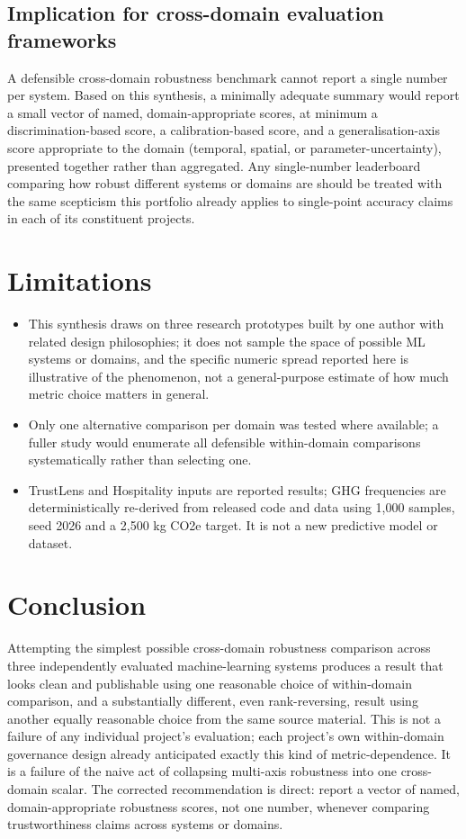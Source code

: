 \documentclass[11pt]{article}
\begin{document}
\subsection{Implication for cross-domain evaluation frameworks}

A defensible cross-domain robustness benchmark cannot report a single number per system. Based on this synthesis, a minimally adequate summary would report a small vector of named, domain-appropriate scores, at minimum a discrimination-based score, a calibration-based score, and a generalisation-axis score appropriate to the domain (temporal, spatial, or parameter-uncertainty), presented together rather than aggregated. Any single-number leaderboard comparing how robust different systems or domains are should be treated with the same scepticism this portfolio already applies to single-point accuracy claims in each of its constituent projects.

\section{Limitations}

\begin{itemize}[leftmargin=*]
    \item This synthesis draws on three research prototypes built by one author with related design philosophies; it does not sample the space of possible ML systems or domains, and the specific numeric spread reported here is illustrative of the phenomenon, not a general-purpose estimate of how much metric choice matters in general.
    \item Only one alternative comparison per domain was tested where available; a fuller study would enumerate all defensible within-domain comparisons systematically rather than selecting one.
    \item TrustLens and Hospitality inputs are reported results; GHG frequencies are deterministically re-derived from released code and data using 1,000 samples, seed 2026 and a 2,500 kg CO2e target. It is not a new predictive model or dataset.
\end{itemize}

\section{Conclusion}

Attempting the simplest possible cross-domain robustness comparison across three independently evaluated machine-learning systems produces a result that looks clean and publishable using one reasonable choice of within-domain comparison, and a substantially different, even rank-reversing, result using another equally reasonable choice from the same source material. This is not a failure of any individual project's evaluation; each project's own within-domain governance design already anticipated exactly this kind of metric-dependence. It is a failure of the naive act of collapsing multi-axis robustness into one cross-domain scalar. The corrected recommendation is direct: report a vector of named, domain-appropriate robustness scores, not one number, whenever comparing trustworthiness claims across systems or domains.
\end{document}
